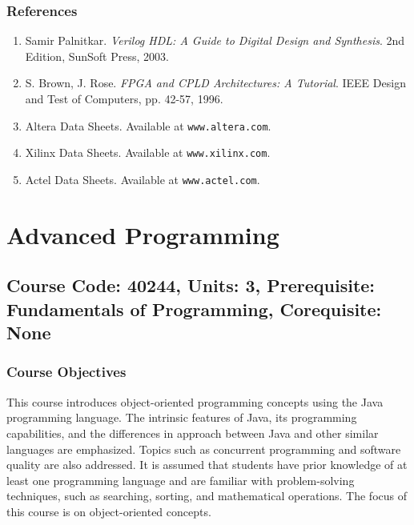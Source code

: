 \documentclass[12pt]{article}
\begin{document}
\subsubsection*{References}
\begin{enumerate}
    \item Samir Palnitkar. \textit{Verilog HDL: A Guide to Digital Design and Synthesis}. 2nd Edition, SunSoft Press, 2003.
    \item S. Brown, J. Rose. \textit{FPGA and CPLD Architectures: A Tutorial}. IEEE Design and Test of Computers, pp. 42-57, 1996.
    \item Altera Data Sheets. Available at \texttt{www.altera.com}.
    \item Xilinx Data Sheets. Available at \texttt{www.xilinx.com}.
    \item Actel Data Sheets. Available at \texttt{www.actel.com}.
\end{enumerate}

\newpage

\section{Advanced Programming}
\subsection*{Course Code: 40244, Units: 3, Prerequisite: Fundamentals of Programming, Corequisite: None}

\subsubsection*{Course Objectives}
This course introduces object-oriented programming concepts using the Java programming language. The intrinsic features of Java, its programming capabilities, and the differences in approach between Java and other similar languages are emphasized. Topics such as concurrent programming and software quality are also addressed. It is assumed that students have prior knowledge of at least one programming language and are familiar with problem-solving techniques, such as searching, sorting, and mathematical operations. The focus of this course is on object-oriented concepts.
\end{document}
